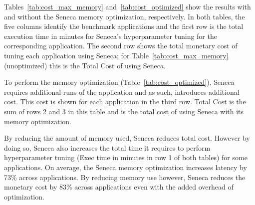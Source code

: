 Tables~\ref{tab:cost_max_memory} and~\ref{tab:cost_optimized} show the results with and without 
the Seneca memory optimization, respectively. In both tables, the five columns identify the 
benchmark applications and the first row is the total execution time in minutes for 
Seneca's hyperparameter tuning for the corresponding application.  
The second row shows the total monetary cost of tuning each application using Seneca;
for Table~\ref{tab:cost_max_memory} (unoptimized) this is the Total Cost of using Seneca.

To perform the memory optimization (Table~\ref{tab:cost_optimized}), 
Seneca requires additional runs of the application
and as such, introduces additional cost.  This cost is shown for each application in 
the third row.  Total Cost is the sum of rows 2 and 3 in this table and is the 
total cost of using Seneca with its memory optimization.

By reducing the amount of memory used, Seneca reduces total cost.  
However by doing so, Seneca also 
increases the total time it requires to perform hyperparameter tuning (Exec time in minutes 
in row 1 of both tables) for some applications.  
On average, the Seneca memory optimization increases latency by 73\% across applications.
By reducing memory use however, Seneca reduces the monetary cost by 83\% across applications 
even with the added overhead of optimization.









